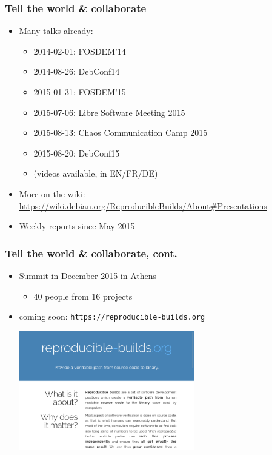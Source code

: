 \documentclass[14pt]{beamer}
\begin{document}
\begin{frame}
 \frametitle{Tell the world \& collaborate}

 \begin{itemize}
  \item Many talks already:
   \begin{itemize}
    \item 2014-02-01: FOSDEM’14
    \item 2014-08-26: DebConf14
    \item 2015-01-31: FOSDEM’15
    \item 2015-07-06: Libre Software Meeting 2015
    \item 2015-08-13: Chaos Communication Camp 2015
    \item 2015-08-20: DebConf15
    \item (videos available, in EN/FR/DE)
   \end{itemize}
  \item More on the wiki:
    {\small \url{https://wiki.debian.org/ReproducibleBuilds/About#Presentations}}
  \item Weekly reports since May 2015
 \end{itemize}
\end{frame}

\begin{frame}
 \frametitle{Tell the world \& collaborate, cont.}

 \begin{itemize}
  \item Summit in December 2015 in Athens
   \begin{itemize}
    \item 40 people from 16 projects
   \end{itemize}
  \item coming soon: \texttt{https://reproducible-builds.org}
  \begin{center}
   \includegraphics[width=0.6\textwidth]{images/rbwww1.png}
  \end{center}
 \end{itemize}
\end{frame}
\end{document}
